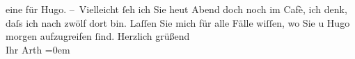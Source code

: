 \begin{ledgroupsized}[t]{13cm}
               eine für Hugo.\pend
           \pstart
           {\pb}– Vielleicht ſeh ich Sie heut Abend doch noch im
               Cafè, ich denk, daſs ich nach zwölf dort bin. Laſſen Sie mich für alle
               Fälle wiſſen, wo Sie u Hugo morgen {\pb}aufzugreifen ſind.\pend
           \pstart
           Herzlich grüßend{\\[\baselineskip]}Ihr \spacefill\mbox{Arth}\pend
           \leftskip=0em{}
         
         \endnumbering{}\end{ledgroupsized}  \newcommand{\dateiname}{L00414}\newcommand{\titel}{Arthur Schnitzler an Richard Beer-Hofmann, [28.  3. 1895?]}\newcommand{\editorInnen}{Martin Anton Müller und Gerd-Hermann Susen}
      